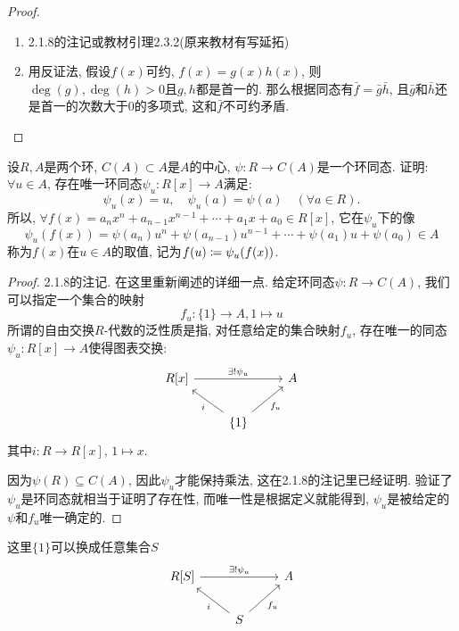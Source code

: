 \documentclass{../solutions-cn}
\begin{document}
\begin{proof}
    \begin{enumerate}[(1)]
        \item 2.1.8的注记或教材引理2.3.2(原来教材有写延拓)
        \item 用反证法, 假设$f(x)$可约, $f(x) = g(x)h(x)$, 则$\deg(g), \deg(h) > 0$且$g, h$都是首一的. 那么根据同态有$\bar{f} = \bar{g}\bar{h}$, 且$\bar{g}$和$\bar{h}$还是首一的次数大于$0$的多项式, 这和$\bar{f}$不可约矛盾.
    \end{enumerate}
\end{proof}

\begin{exercise}[习题2.3.7]
    设$R, A$是两个环, $C(A) \subset A$是$A$的中心,
$\psi:R \to C(A)$是一个环同态. 证明: $\forall u \in A$,
存在唯一环同态$\psi_u:R[x] \to A$满足: 
\[
    \psi_u(x) = u,\quad \psi_u(a) = \psi(a) \quad (\forall a \in R).
\]
所以, $\forall f(x) = a_nx^n + a_{n - 1}x^{n - 1} + \cdots + a_1x + a_0 \in R[x]$,
它在$\psi_u$下的像
\[
    \psi_u(f(x)) = \psi(a_n)u^n + \psi(a_{n - 1})u^{n - 1} + \cdots + \psi(a_1)u + \psi(a_0) \in A
\]
称为$f(x)$在$u \in A$的取值, 记为$f(u) \mathrel{\coloneqq} \psi_u(f(x))$.
\end{exercise}

\begin{proof}
    2.1.8的注记. 在这里重新阐述的详细一点. 给定环同态$\psi:R \to C(A)$, 我们可以指定一个集合的映射
    \[
        f_u:\{1\} \to A, 1 \mapsto u
    \]
    所谓的自由交换$R$-代数的泛性质是指, 对任意给定的集合映射$f_u$, 存在唯一的同态$\psi_u:R[x] \to A$使得图表交换:
    \[
        \begin{tikzcd}
            {R[x]} \arrow[rr, "\exists!\psi_u"] &                                          & A \\
                                                & \{1\} \arrow[lu, "i"] \arrow[ru, "f_u"'] &  
        \end{tikzcd}
    \]
    其中$i:R \to R[x],\, 1 \mapsto x$.

    因为$\psi(R) \subseteq C(A)$, 因此$\psi_u$才能保持乘法, 这在2.1.8的注记里已经证明. 验证了$\psi_u$是环同态就相当于证明了存在性, 而唯一性是根据定义就能得到, $\psi_u$是被给定的$\psi$和$f_u$唯一确定的.
\end{proof}

\begin{remark}
    这里$\{1\}$可以换成任意集合$S$
\[
    \begin{tikzcd}
        {R[S]} \arrow[rr, "\exists!\psi_u"] &                                      & A \\
                                            & S \arrow[lu, "i"] \arrow[ru, "f_u"'] &  
        \end{tikzcd}
\]
\end{remark}
\end{document}

